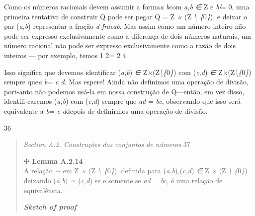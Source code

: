 \documentclass[
]{article}
\begin{document}
Como os números racionais devem assumir a forma\emph{a b}com \emph{a,b
∈} Z e \emph{b ̸}= 0, uma primeira tentativa de construir Q pode ser
pegar Q = Z \emph{×} (Z \emph{\textbackslash{} \{}0\emph{\}}), e deixar
o par (\emph{a,b}) representar a fração \emph{d fracab}. Mas assim como
um número inteiro não pode ser expresso exclusivamente como a diferença
de dois números naturais, um número racional não pode ser expresso
exclusivamente como a razão de dois inteiros --- por exemplo, temos 1 2=
2 4.

Isso significa que devemos identificar (\emph{a,b}) \emph{∈}
Z\emph{×}(Z\emph{\textbackslash\{}0\emph{\}}) com (\emph{c,d}) \emph{∈}
Z\emph{×}(Z\emph{\textbackslash\{}0\emph{\}}) sempre que\emph{a b}=
\emph{c d}. Mas espere! Ainda não definimos uma operação de divisão,
port-anto não podemos usá-la em nossa construção de Q---então, em vez
disso, identifi-caremos (\emph{a,b}) com (\emph{c,d}) sempre que
\emph{ad} = \emph{bc}, observando que isso será equivalente a \emph{b}=
\emph{c d}depois de definirmos uma operação de divisão.

36

\begin{quote}
\emph{Section A.2. Construções dos conjuntos de números} 37

✣ \textbf{Lemma A.2.14}\\
A relação \emph{∼} em Z \emph{×} (Z \emph{\textbackslash{}
\{}0\emph{\}}), definida para (\emph{a,b})\emph{,}(\emph{c,d}) \emph{∈}
Z \emph{×} (Z \emph{\textbackslash{} \{}0\emph{\}}) deixando
(\emph{a,b}) \emph{∼} (\emph{c,d}) se e somente se \emph{ad} =
\emph{bc}, é uma relação de equivalência.

\emph{\textbf{Sketch of proof}}
\end{quote}
\end{document}
